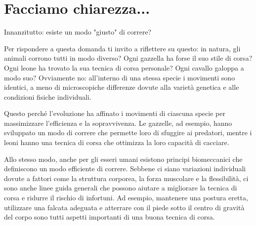 \section{Facciamo chiarezza...}

Innanzitutto: esiste un modo "giusto" di correre?

Per rispondere a questa domanda
ti invito a riflettere su questo:
in natura, gli animali corrono tutti in modo diverso?
Ogni gazzella ha forse il suo stile di corsa?
Ogni leone ha trovato la sua tecnica di corsa personale?
Ogni cavallo galoppa a modo suo?
Ovviamente no: all'interno di una stessa specie
i movimenti sono identici,
a meno di microscopiche differenze dovute alla varietà genetica e alle condizioni fisiche individuali.

Questo perché l’evoluzione ha affinato i movimenti di ciascuna specie per massimizzare l’efficienza
e la sopravvivenza. Le gazzelle, ad esempio, hanno sviluppato un modo di correre che permette loro
di sfuggire ai predatori, mentre i leoni hanno una tecnica di corsa che ottimizza la loro capacità di cacciare.

Allo stesso modo, anche per gli esseri umani esistono principi biomeccanici che definiscono
un modo efficiente di correre. Sebbene ci siano variazioni individuali dovute a fattori
come la struttura corporea, la forza muscolare e la flessibilità, ci sono anche linee guida generali
che possono aiutare a migliorare la tecnica di corsa e ridurre il rischio di infortuni.
Ad esempio, mantenere una postura eretta, utilizzare una falcata adeguata e atterrare
con il piede sotto il centro di gravità del corpo sono tutti aspetti importanti di una buona tecnica di corsa.

